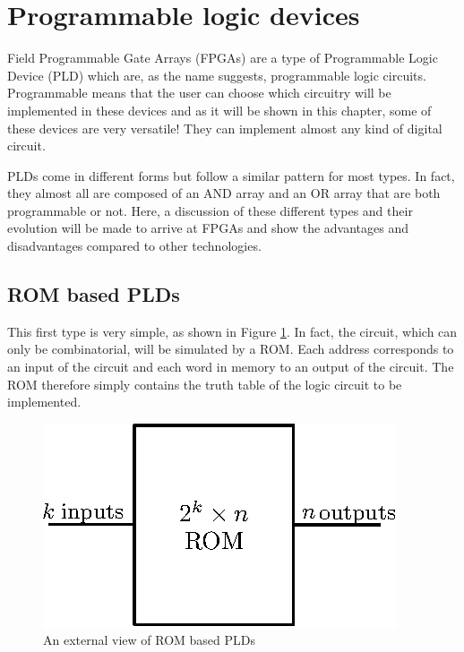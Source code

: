 \section{Programmable logic devices}

Field Programmable Gate Arrays (FPGAs) are a type of Programmable Logic Device (PLD) which are, as 
the name suggests, programmable logic circuits. Programmable means that the user can choose which 
circuitry will be implemented in these devices and as it will be shown in this chapter, some of 
these devices are very versatile! They can implement almost any kind of digital circuit.

PLDs come in different forms but follow a similar pattern for most types. In fact, they almost all 
are composed of an AND array and an OR array that are both programmable or not. Here, a discussion 
of these different types and their evolution will be made to arrive at FPGAs and show the advantages 
and disadvantages compared to other technologies.

\subsection{ROM based PLDs}

This first type is very simple, as shown in Figure \ref{fig:fpga/pld_rom_external}. In fact, the 
circuit, which can only be combinatorial, will be simulated by a ROM. Each address corresponds to 
an input of the circuit and each word in memory to an output of the circuit. The ROM therefore 
simply contains the truth table of the logic circuit to be implemented.

\begin{figure}[ht]
    \centering
    \includegraphics[scale=1.2]{Chapter1-Hardware/res/pld_rom_external}
    \caption{An external view of ROM based PLDs}
    \label{fig:fpga/pld_rom_external}
\end{figure}

